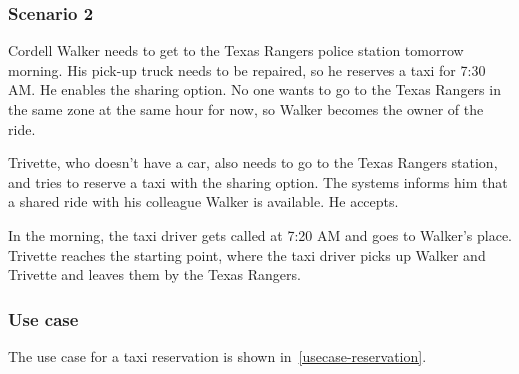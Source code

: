 \subsubsection{Scenario 2}
Cordell Walker needs to get to the Texas Rangers police station tomorrow morning.
His pick-up truck needs to be repaired, so he reserves a taxi for 7:30 AM. He enables the sharing option.
No one wants to go to the Texas Rangers in the same zone at the same hour for now, so Walker becomes the owner of the ride.

Trivette, who doesn't have a car, also needs to go to the Texas Rangers station, and tries to reserve a taxi with the sharing option.
The systems informs him that a shared ride with his colleague Walker is available. He accepts.

In the morning, the taxi driver gets called at 7:20 AM and goes to Walker's place.
Trivette reaches the starting point, where the taxi driver picks up Walker and Trivette and leaves them by the Texas Rangers.

\subsubsection{Use case}
The use case for a taxi reservation is shown in~\autoref{usecase-reservation}.

